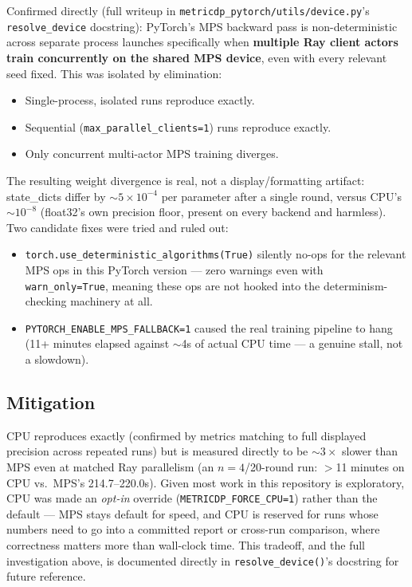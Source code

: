 \documentclass[11pt]{article}
\newcommand{\code}[1]{\texttt{#1}}
\begin{document}
Confirmed directly (full writeup in \code{metricdp\_pytorch/utils/device.py}'s
\code{resolve\_device} docstring): PyTorch's MPS backward pass is non-deterministic across separate
process launches specifically when \textbf{multiple Ray client actors train concurrently on the
shared MPS device}, even with every relevant seed fixed. This was isolated by elimination:
\begin{itemize}[leftmargin=1.4em]
    \item Single-process, isolated runs reproduce exactly.
    \item Sequential (\code{max\_parallel\_clients=1}) runs reproduce exactly.
    \item Only concurrent multi-actor MPS training diverges.
\end{itemize}
The resulting weight divergence is real, not a display/formatting artifact: state\_dicts differ by
$\sim\!5\times10^{-4}$ per parameter after a single round, versus CPU's $\sim\!10^{-8}$ (float32's
own precision floor, present on every backend and harmless). Two candidate fixes were tried and
ruled out:
\begin{itemize}[leftmargin=1.4em]
    \item \code{torch.use\_deterministic\_algorithms(True)} silently no-ops for the relevant MPS
    ops in this PyTorch version --- zero warnings even with \code{warn\_only=True}, meaning these
    ops are not hooked into the determinism-checking machinery at all.
    \item \code{PYTORCH\_ENABLE\_MPS\_FALLBACK=1} caused the real training pipeline to hang
    (11+ minutes elapsed against $\sim$4s of actual CPU time --- a genuine stall, not a slowdown).
\end{itemize}

\subsection{Mitigation}

CPU reproduces exactly (confirmed by metrics matching to full displayed precision across repeated
runs) but is measured directly to be $\sim\!3\times$ slower than MPS even at matched Ray parallelism
(an $n{=}4$/20-round run: $>$11 minutes on CPU vs.\ MPS's 214.7--220.0s). Given most work in this
repository is exploratory, CPU was made an \emph{opt-in} override
(\code{METRICDP\_FORCE\_CPU=1}) rather than the default --- MPS stays default for speed, and CPU is
reserved for runs whose numbers need to go into a committed report or cross-run comparison, where
correctness matters more than wall-clock time. This tradeoff, and the full investigation above, is
documented directly in \code{resolve\_device()}'s docstring for future reference.
\end{document}
